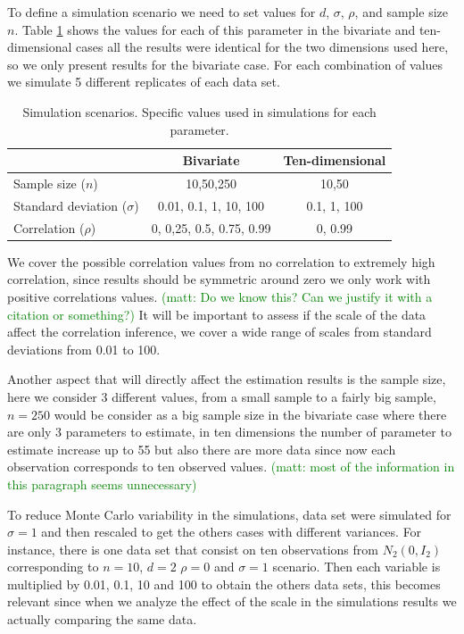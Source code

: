 \documentclass[a4paper]{article}
\newcommand{\matt}[1]{\textcolor{green}{(matt: #1)}}
\begin{document}
To define a simulation scenario we need to set values for $d$, $\sigma$, $\rho$, and sample size $n$. Table \ref{scen} shows the values for each of this parameter in the bivariate and ten-dimensional cases all the results were identical for the two dimensions used here, so we only present results for the bivariate case. For each combination of values we simulate 5 different replicates of each data set.  

\begin{table}[htbp]
   \centering
   \caption{Simulation scenarios. Specific values used in simulations for each parameter. \label{scen}} 
     \begin{tabular}{lcc} \hline
          &  Bivariate    & Ten-dimensional  \\ \hline
      Sample size   ($n$)   & 10,50,250   &  10,50  \\
      Standard deviation ($\sigma$)  & 0.01, 0.1, 1, 10, 100 & 0.1, 1, 100 \\
      Correlation ($\rho$)   &  0, 0,25, 0.5, 0.75, 0.99  &  0, 0.99 \\ \hline
   \end{tabular}
\end{table}

We cover the possible correlation values from no correlation to extremely high correlation, since results should be symmetric around zero we only work with positive correlations values. \matt{Do we know this? Can we justify it with a citation or something?} It will be important to assess if the scale of the data affect the correlation inference, we cover a wide range of scales from standard deviations from 0.01 to 100. 

Another aspect that will directly affect the estimation results is the sample size, here we consider 3 different values, from a small sample to a fairly big sample, $n=250$ would be consider as a big sample size in the bivariate case where there are only 3 parameters to estimate, in ten dimensions the number of parameter to estimate increase up to 55 but also there are more data since now each observation corresponds to ten observed values. \matt{most of the information in this paragraph seems unnecessary}

To reduce Monte Carlo variability in the simulations, data set were simulated for $\sigma=1$ and then rescaled to get the others cases with different variances. For instance, there is one data set that consist on ten observations from $N_2(0, I_2 )$ corresponding to $n=10$, $d=2$ $\rho=0$ and $\sigma=1$ scenario. Then each variable is multiplied by 0.01, 0.1, 10  and 100 to obtain the others data sets, this becomes relevant since when we analyze the effect of the scale in the simulations results we actually comparing the same data. 
\end{document}
